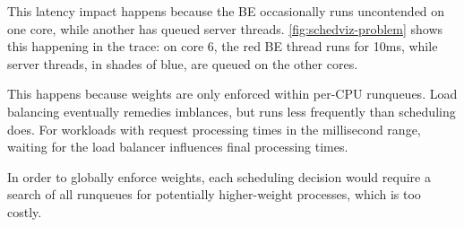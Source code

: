 This latency impact happens because the BE occasionally runs uncontended on one
core, while another has queued server threads. \autoref{fig:schedviz-problem}
shows this happening in the trace: on core 6, the red BE thread runs for 10ms,
while server threads, in shades of blue, are queued on the other cores.

This happens because weights are only enforced within per-CPU runqueues. Load
balancing eventually remedies imblances, but runs less frequently than
scheduling does. For workloads with request processing times in the millisecond
range, waiting for the load balancer influences final processing times.

In order to globally enforce weights, each scheduling decision would require a
search of all runqueues for potentially higher-weight processes, which is too
costly. 




